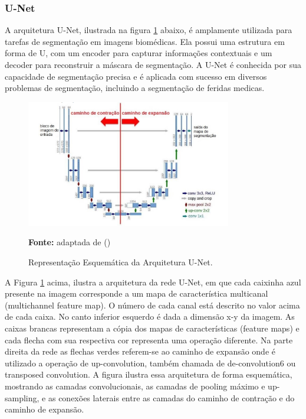     
    \subsubsection{U-Net}

        A arquitetura \ac{U-Net}, ilustrada na figura \ref{fig:arquiteturaUNet} abaixo,  é amplamente utilizada para tarefas de segmentação em imagens biomédicas. Ela possui uma estrutura em forma de U, com um encoder para capturar informações contextuais e um decoder para reconstruir a máscara de segmentação. A \ac{U-Net} é conhecida por sua capacidade de segmentação precisa e é aplicada com sucesso em diversos problemas de segmentação, incluindo a segmentação de feridas medicas.

        \begin{figure}[htbp]
            \centering
             \caption{Representação Esquemática da Arquitetura \ac{U-Net}. }
            \includegraphics[width=0.8\textwidth]{img/arquitetura_U-Net.png}
            \label{fig:arquiteturaUNet}
            \par\medskip\textbf{Fonte:} adaptada de (\cite{ronneberger2015u})
        \end{figure}
        
        \clearpage

            A Figura \ref{fig:arquiteturaUNet} acima, ilustra a arquitetura da rede \ac{U-Net}, em que cada caixinha azul presente na imagem corresponde a um mapa de característica multicanal (multichannel feature map). O número de cada canal está descrito no valor acima de cada caixa. No canto inferior esquerdo é dada a dimensão x-y da imagem. As caixas brancas representam a cópia dos mapas de características (feature maps) e cada flecha com sua respectiva cor representa uma operação diferente. Na parte direita da rede as flechas verdes referem-se ao caminho de expansão onde é utilizado a operação de up-convolution, também chamada de de-convolution6 ou transposed convolution. A figura ilustra essa arquitetura de forma esquemática, mostrando as camadas convolucionais, as camadas de pooling máximo e up-sampling, e as conexões laterais entre as camadas do caminho de contração e do caminho de expansão.


